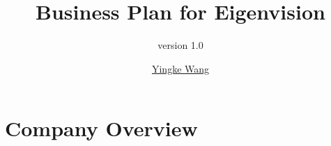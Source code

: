 \documentclass{beamer}
\title{Business Plan for Eigenvision}
\subtitle{version 1.0}
\author{\href{mailto:mattia.ippoliti@studenti.polito.it}{Yingke Wang}}
\newcommand{\hrefcol}[2]{\textcolor{cyan}{\href{#1}{#2}}}
\begin{document}
\maketitle

%
%
%
%



\section{Company Overview}

\end{document}
